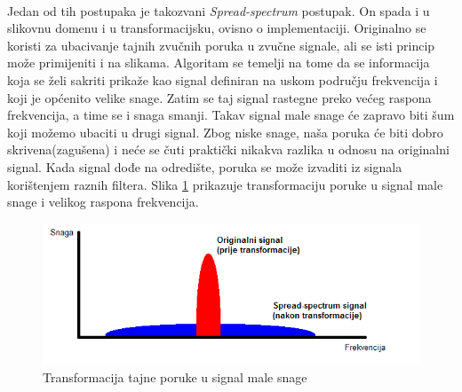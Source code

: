 \documentclass[times, utf8, seminar, numeric]{fer}
\begin{document}
\paragraph{}
Jedan od tih postupaka je takozvani \textit{Spread-spectrum} postupak. On spada i u slikovnu domenu i u transformacijsku, ovisno o implementaciji. Originalno se koristi za ubacivanje tajnih zvučnih poruka u zvučne signale, ali se isti princip može primijeniti i na slikama. Algoritam se temelji na tome da se informacija koja se želi sakriti prikaže kao signal definiran na uskom području frekvencija i koji je općenito velike snage. Zatim se taj signal rastegne preko većeg raspona frekvencija, a time se i snaga smanji. Takav signal male snage će zapravo biti šum koji možemo ubaciti u drugi signal. Zbog niske snage, naša poruka će biti dobro skrivena(zagušena) i neće se čuti praktički nikakva razlika u odnosu na originalni signal. Kada signal dođe na odredište, poruka se može izvaditi iz signala korištenjem raznih filtera.  Slika \ref{transfrom} prikazuje transformaciju poruke u signal male snage i velikog raspona frekvencija.
\begin{figure}
\caption{Transformacija tajne poruke u signal male snage}
\label{transfrom}
\centerline{\includegraphics[scale=0.8]{images/transformation.png}}
\end{figure}
\end{document}
